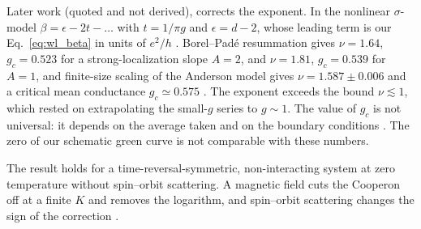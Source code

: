Later work (quoted and not derived), corrects the exponent. In the nonlinear $\sigma$-model $\beta=\epsilon-2t-\dots$ with $t=1/\pi g$ and $\epsilon=d-2$, whose leading term is our Eq.~\eqref{eq:wl_beta} in units of $e^2/h$ \cite{UeokaSlevin2017}. Borel--Pad\'e resummation gives $\nu=1.64$, $g_c=0.523$ for a strong-localization slope $A=2$, and $\nu=1.81$, $g_c=0.539$ for $A=1$, and finite-size scaling of the Anderson model gives $\nu=1.587\pm0.006$ and a critical mean conductance $g_c\simeq0.575$ \cite{UeokaSlevin2017}. The exponent exceeds the bound $\nu\lesssim1$, which rested on extrapolating the small-$g$ series to $g\sim1$. The value of $g_c$ is not universal: it depends on the average taken and on the boundary conditions \cite{SlevinMarkosOhtsuki2001}. The zero of our schematic green curve is not comparable with these numbers.

The result holds for a time-reversal-symmetric, non-interacting system at zero temperature without spin--orbit scattering. A magnetic field cuts the Cooperon off at a finite $K$ and removes the logarithm, and spin--orbit scattering changes the sign of the correction \cite{Hikami1980}.